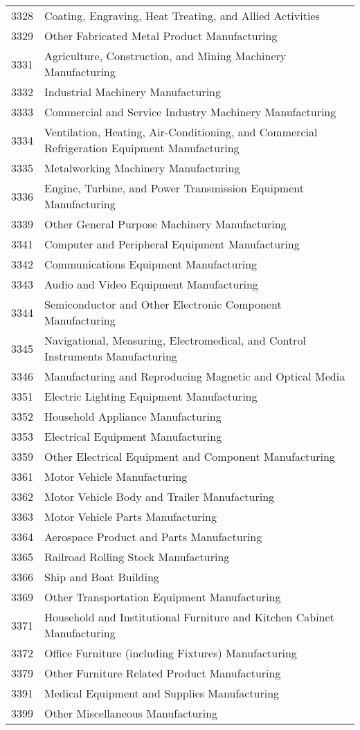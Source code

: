 \documentclass[11pt]{article}
\begin{document}
\begin{spacing}{1}
\begin{table}[ht]
\begin{tabular} { ll }
3328   &  Coating, Engraving, Heat Treating, and Allied Activities \\
3329   &  Other Fabricated Metal Product Manufacturing \\
3331   &  Agriculture, Construction, and Mining Machinery Manufacturing \\
3332   &  Industrial Machinery Manufacturing \\
3333   &  Commercial and Service Industry Machinery Manufacturing \\
3334   &  Ventilation, Heating, Air-Conditioning, and Commercial Refrigeration Equipment Manufacturing \\
3335   &  Metalworking Machinery Manufacturing \\
3336   &  Engine, Turbine, and Power Transmission Equipment Manufacturing \\
3339   &  Other General Purpose Machinery Manufacturing \\
3341   &  Computer and Peripheral Equipment Manufacturing \\
3342   &  Communications Equipment Manufacturing \\
3343   &  Audio and Video Equipment Manufacturing \\
3344   &  Semiconductor and Other Electronic Component Manufacturing \\
3345   &  Navigational, Measuring, Electromedical, and Control Instruments Manufacturing \\
3346   &  Manufacturing and Reproducing Magnetic and Optical Media \\
3351   &  Electric Lighting Equipment Manufacturing \\
3352   &  Household Appliance Manufacturing \\
3353   &  Electrical Equipment Manufacturing \\
3359   &  Other Electrical Equipment and Component Manufacturing \\
3361   &  Motor Vehicle Manufacturing \\
3362   &  Motor Vehicle Body and Trailer Manufacturing \\
3363   &  Motor Vehicle Parts Manufacturing \\
3364   &  Aerospace Product and Parts Manufacturing \\
3365   &  Railroad Rolling Stock Manufacturing \\
3366   &  Ship and Boat Building \\
3369   &  Other Transportation Equipment Manufacturing \\
3371   &  Household and Institutional Furniture and Kitchen Cabinet Manufacturing \\
3372   &  Office Furniture (including Fixtures) Manufacturing \\
3379   &  Other Furniture Related Product Manufacturing \\
3391   &  Medical Equipment and Supplies Manufacturing \\
3399   &  Other Miscellaneous Manufacturing \\ \hline
\end{tabular}
\end{table}
\end{spacing}
\end{document}
